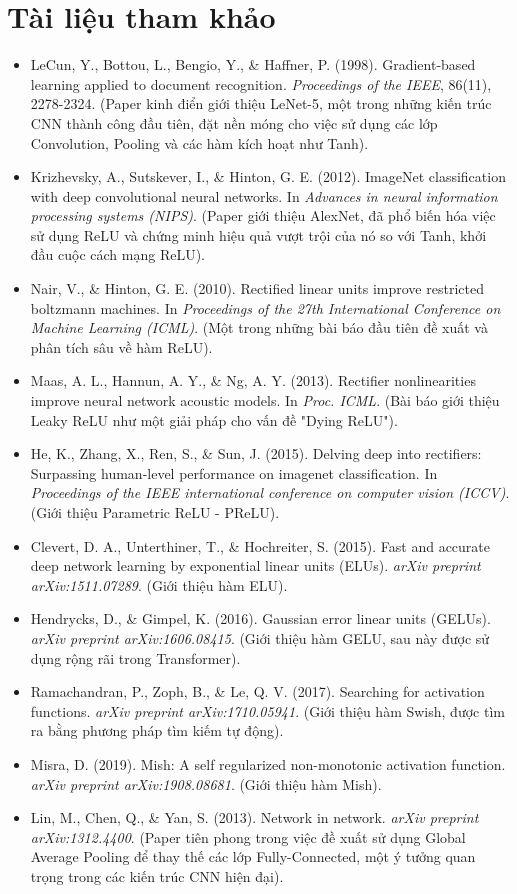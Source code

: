 \section*{Tài liệu tham khảo}
\begin{itemize}
	\item[1] LeCun, Y., Bottou, L., Bengio, Y., \& Haffner, P. (1998). Gradient-based learning applied to document recognition. \textit{Proceedings of the IEEE}, 86(11), 2278-2324. (Paper kinh điển giới thiệu LeNet-5, một trong những kiến trúc CNN thành công đầu tiên, đặt nền móng cho việc sử dụng các lớp Convolution, Pooling và các hàm kích hoạt như Tanh).
	\item[2] Krizhevsky, A., Sutskever, I., \& Hinton, G. E. (2012). ImageNet classification with deep convolutional neural networks. In \textit{Advances in neural information processing systems (NIPS)}. (Paper giới thiệu AlexNet, đã phổ biến hóa việc sử dụng ReLU và chứng minh hiệu quả vượt trội của nó so với Tanh, khởi đầu cuộc cách mạng ReLU).
	\item[3] Nair, V., \& Hinton, G. E. (2010). Rectified linear units improve restricted boltzmann machines. In \textit{Proceedings of the 27th International Conference on Machine Learning (ICML)}. (Một trong những bài báo đầu tiên đề xuất và phân tích sâu về hàm ReLU).
	\item[4] Maas, A. L., Hannun, A. Y., \& Ng, A. Y. (2013). Rectifier nonlinearities improve neural network acoustic models. In \textit{Proc. ICML}. (Bài báo giới thiệu Leaky ReLU như một giải pháp cho vấn đề "Dying ReLU").
	\item[5] He, K., Zhang, X., Ren, S., \& Sun, J. (2015). Delving deep into rectifiers: Surpassing human-level performance on imagenet classification. In \textit{Proceedings of the IEEE international conference on computer vision (ICCV)}. (Giới thiệu Parametric ReLU - PReLU).
	\item[6] Clevert, D. A., Unterthiner, T., \& Hochreiter, S. (2015). Fast and accurate deep network learning by exponential linear units (ELUs). \textit{arXiv preprint arXiv:1511.07289}. (Giới thiệu hàm ELU).
	\item[7] Hendrycks, D., \& Gimpel, K. (2016). Gaussian error linear units (GELUs). \textit{arXiv preprint arXiv:1606.08415}. (Giới thiệu hàm GELU, sau này được sử dụng rộng rãi trong Transformer).
	\item[8] Ramachandran, P., Zoph, B., \& Le, Q. V. (2017). Searching for activation functions. \textit{arXiv preprint arXiv:1710.05941}. (Giới thiệu hàm Swish, được tìm ra bằng phương pháp tìm kiếm tự động).
	\item[9] Misra, D. (2019). Mish: A self regularized non-monotonic activation function. \textit{arXiv preprint arXiv:1908.08681}. (Giới thiệu hàm Mish).
	\item[10] Lin, M., Chen, Q., \& Yan, S. (2013). Network in network. \textit{arXiv preprint arXiv:1312.4400}. (Paper tiên phong trong việc đề xuất sử dụng Global Average Pooling để thay thế các lớp Fully-Connected, một ý tưởng quan trọng trong các kiến trúc CNN hiện đại).
\end{itemize}
